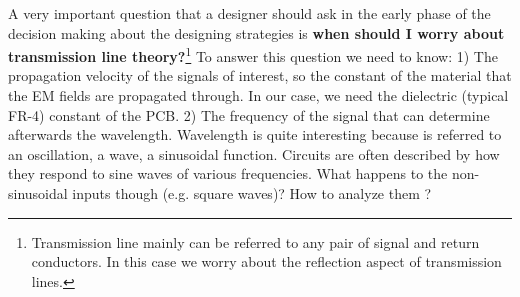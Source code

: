 \documentclass[final]{cubedoc}
\begin{document}
	A very important question that a designer should ask in the early phase of the decision making about the designing strategies is \textbf{when should I worry about transmission line theory?}\footnote{Transmission line mainly can be referred to any pair of signal and return conductors. In this case we worry about the reflection aspect of transmission lines.} To answer this question we need to know: 1) The propagation velocity of the signals of interest, so the constant of the material that the EM fields are propagated through. In our case, we need the dielectric (typical FR-4) constant of the PCB. 2) The frequency of the signal that can determine afterwards the wavelength. Wavelength is quite interesting because is referred to an oscillation, a wave, a sinusoidal function. Circuits are often described by how they respond to sine waves of various frequencies. What happens to the non-sinusoidal inputs though (e.g. square waves)? How to analyze them \cite{morrison2002fields}? 
	
	
	
	
	
\end{document}
